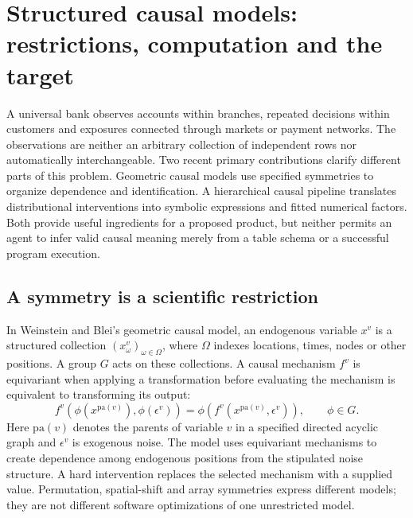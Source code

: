 \section{Structured causal models: restrictions, computation and the target}
\label{exec23:structured-scope}

A universal bank observes accounts within branches, repeated decisions within
customers and exposures connected through markets or payment networks. The
observations are neither an arbitrary collection of independent rows nor
automatically interchangeable. Two recent primary contributions clarify
different parts of this problem. Geometric causal models use specified
symmetries to organize dependence and identification. A hierarchical causal
pipeline translates distributional interventions into symbolic expressions
and fitted numerical factors. Both provide useful ingredients for a proposed
product, but neither permits an agent to infer valid causal meaning merely
from a table schema or a successful program execution.
\citep{exec23_geometric_models,exec23_hierarchical_pipeline}

\subsection{A symmetry is a scientific restriction}
\label{exec23:structured-symmetry}

In Weinstein and Blei's geometric causal model, an endogenous variable
$x^v$ is a structured collection $(x^v_\omega)_{\omega\in\Omega}$,
where $\Omega$ indexes locations, times, nodes or other positions. A
group $G$ acts on these collections. A causal mechanism $f^v$ is equivariant
when applying a transformation before evaluating the mechanism is equivalent
to transforming its output:
\begin{equation}
 f^v(\phi(x^{\mathrm{pa}(v)}),\phi(\epsilon^v))
 =\phi\!\left(f^v(x^{\mathrm{pa}(v)},\epsilon^v)\right),
 \qquad \phi\in G.
 \label{exec23:structured-equivariance}
\end{equation}
Here $\mathrm{pa}(v)$ denotes the parents of variable $v$ in a specified
directed acyclic graph and $\epsilon^v$ is exogenous noise. The model uses
equivariant mechanisms to create dependence among endogenous positions from
the stipulated noise structure. A hard intervention replaces the selected
mechanism with a supplied value. Permutation, spatial-shift and array
symmetries express different models; they are not different software
optimizations of one unrestricted model.
\citep{exec23_geometric_models}

